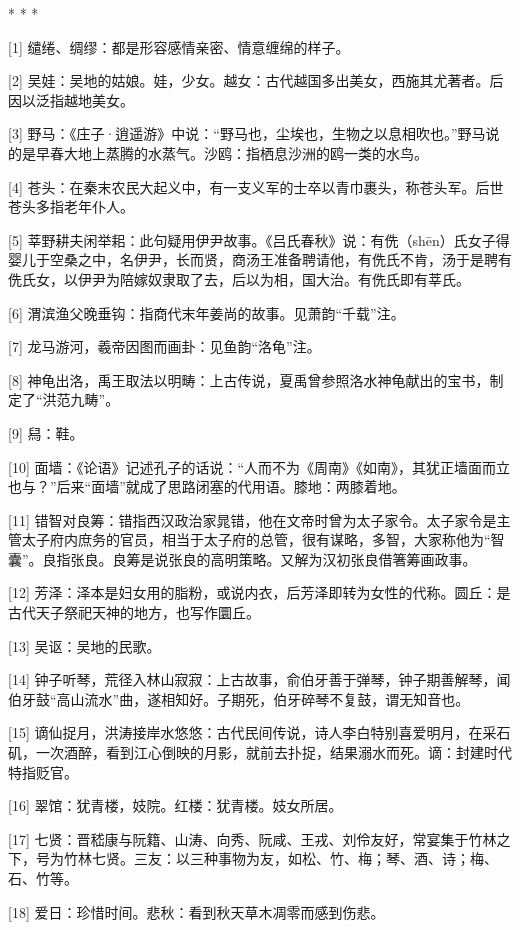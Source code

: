 \documentclass[12pt,UTF8]{ctexbook}
\begin{document}
* * *



[1] 缱绻、绸缪：都是形容感情亲密、情意缠绵的样子。

[2] 吴娃：吴地的姑娘。娃，少女。越女：古代越国多出美女，西施其尤著者。后因以泛指越地美女。

[3] 野马：《庄子·逍遥游》中说：“野马也，尘埃也，生物之以息相吹也。”野马说的是早春大地上蒸腾的水蒸气。沙鸥：指栖息沙洲的鸥一类的水鸟。

[4] 苍头：在秦末农民大起义中，有一支义军的士卒以青巾裹头，称苍头军。后世苍头多指老年仆人。

[5] 莘野耕夫闲举耜：此句疑用伊尹故事。《吕氏春秋》说：有侁（shēn）氏女子得婴儿于空桑之中，名伊尹，长而贤，商汤王准备聘请他，有侁氏不肯，汤于是聘有侁氏女，以伊尹为陪嫁奴隶取了去，后以为相，国大治。有侁氏即有莘氏。

[6] 渭滨渔父晚垂钩：指商代末年姜尚的故事。见萧韵“千载”注。

[7] 龙马游河，羲帝因图而画卦：见鱼韵“洛龟”注。

[8] 神龟出洛，禹王取法以明畴：上古传说，夏禹曾参照洛水神龟献出的宝书，制定了“洪范九畴”。

[9] 舄：鞋。

[10] 面墙：《论语》记述孔子的话说：“人而不为《周南》《如南》，其犹正墙面而立也与？”后来“面墙”就成了思路闭塞的代用语。膝地：两膝着地。

[11] 错智对良筹：错指西汉政治家晁错，他在文帝时曾为太子家令。太子家令是主管太子府内庶务的官员，相当于太子府的总管，很有谋略，多智，大家称他为“智囊”。良指张良。良筹是说张良的高明策略。又解为汉初张良借箸筹画政事。

[12] 芳泽：泽本是妇女用的脂粉，或说内衣，后芳泽即转为女性的代称。圆丘：是古代天子祭祀天神的地方，也写作圜丘。

[13] 吴讴：吴地的民歌。

[14] 钟子听琴，荒径入林山寂寂：上古故事，俞伯牙善于弹琴，钟子期善解琴，闻伯牙鼓“高山流水”曲，遂相知好。子期死，伯牙碎琴不复鼓，谓无知音也。

[15] 谪仙捉月，洪涛接岸水悠悠：古代民间传说，诗人李白特别喜爱明月，在采石矶，一次酒醉，看到江心倒映的月影，就前去扑捉，结果溺水而死。谪：封建时代特指贬官。

[16] 翠馆：犹青楼，妓院。红楼：犹青楼。妓女所居。

[17] 七贤：晋嵇康与阮籍、山涛、向秀、阮咸、王戎、刘伶友好，常宴集于竹林之下，号为竹林七贤。三友：以三种事物为友，如松、竹、梅；琴、酒、诗；梅、石、竹等。

[18] 爱日：珍惜时间。悲秋：看到秋天草木凋零而感到伤悲。
\end{document}
